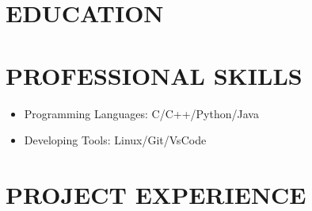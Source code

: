 \documentclass[10pt,a4paper,sans]{moderncv} %
\begin{document}
\makecvtitle %



\section{EDUCATION}




\section{PROFESSIONAL SKILLS}
\begin{itemize}
\setlength{\itemindent}{2em}
   \item Programming Languages: C/C++/Python/Java
  	\item Developing Tools: Linux/Git/VsCode
\end{itemize}


\section{PROJECT EXPERIENCE}
\end{document}
